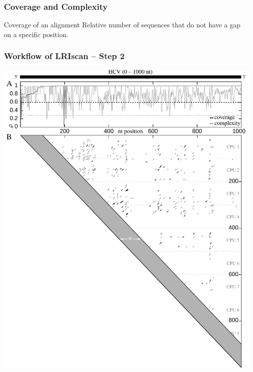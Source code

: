 \begin{frame}[c]\frametitle{Coverage and Complexity}
	\begin{minipage}[t]{0.45\textwidth}
		\begin{block}{Coverage of an alignment}
			Relative number of sequences that do not have a gap on a specific position.
		\end{block}
	\end{minipage} \hfill {}
\end{frame}

\begin{frame}[c]\frametitle{Workflow of LRIscan -- Step 2}
	\begin{center}
		\includegraphics[height=0.9\textheight]{figures/lri_workflow_2.pdf}
	\end{center}
\end{frame}

